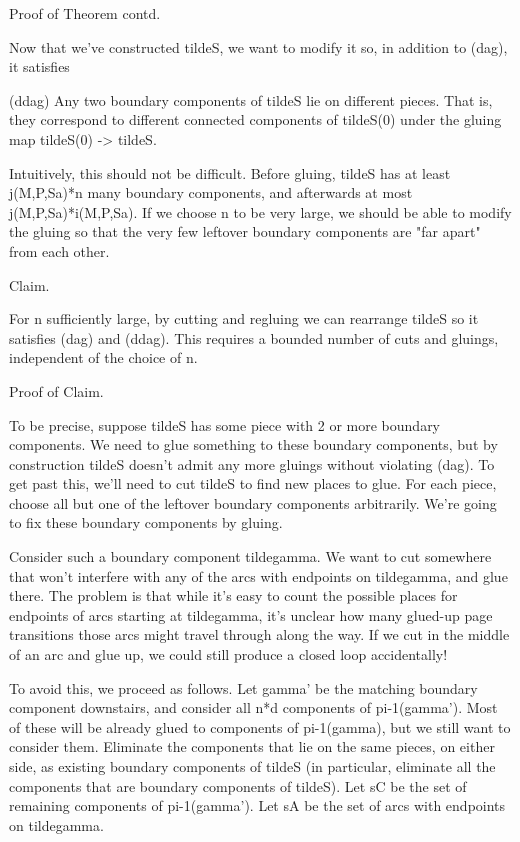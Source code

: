 \documentclass[12pt]{amsart}
\theoremstyle{definition}
\theoremstyle{remark}
\begin{document}
%

Proof of Theorem contd.

Now that we've constructed tildeS, we want to modify it so, in addition to
(dag), it satisfies

(ddag) Any two boundary components of tildeS lie on different pieces. That is,
they correspond to different connected components of tildeS(0) under the gluing
map tildeS(0) -> tildeS.

Intuitively, this should not be difficult. Before gluing, tildeS has at least
j(M,P,Sa)*n many boundary components, and afterwards at most
j(M,P,Sa)*i(M,P,Sa). If we choose n to be very large, we should be able to
modify the gluing so that the very few leftover boundary components are "far
apart" from each other.

Claim.

For n sufficiently large, by cutting and regluing we can rearrange tildeS so it
satisfies (dag) and (ddag). This requires a bounded number of cuts and gluings,
independent of the choice of n.

Proof of Claim.

To be precise, suppose tildeS has some piece with 2 or more boundary
components. We need to glue something to these boundary components, but by
construction tildeS doesn't admit any more gluings without violating (dag). To
get past this, we'll need to cut tildeS to find new places to glue. For each
piece, choose all but one of the leftover boundary components arbitrarily.
We're going to fix these boundary components by gluing.

Consider such a boundary component tildegamma. We want to cut somewhere that
won't interfere with any of the arcs with endpoints on tildegamma, and glue
there.  The problem is that while it's easy to count the possible places for
endpoints of arcs starting at tildegamma, it's unclear how many glued-up page
transitions those arcs might travel through along the way. If we cut in the
middle of an arc and glue up, we could still produce a closed loop
accidentally!

To avoid this, we proceed as follows. Let gamma' be the matching boundary
component downstairs, and consider all n*d components of pi-1(gamma'). Most of
these will be already glued to components of pi-1(gamma), but we still want to
consider them. Eliminate the components that lie on the same pieces, on either
side, as existing boundary components of tildeS (in particular, eliminate all
the components that are boundary components of tildeS).  Let sC be the set of
remaining components of pi-1(gamma').  Let sA be the set of arcs with endpoints
on tildegamma.
\end{document}
